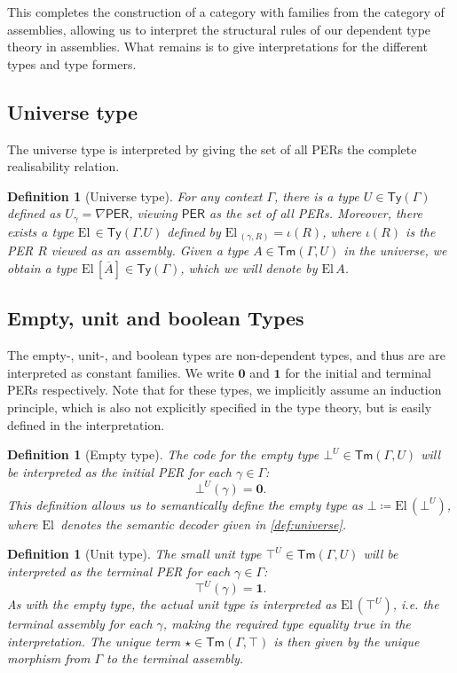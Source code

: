 \documentclass[10pt,a4paper]{article}
\newtheorem{definition}[theorem]{Definition}
\theoremstyle{definition}
\theoremstyle{remark}
\renewcommand{\.}{.\,} %
\renewcommand{\:}{:} %
\newcommand{\El}{\mathrm{El}\,}
\newcommand{\0}{\mathbf{0}}
\newcommand{\1}{\mathbf{1}}
\newcommand\<\langle
\renewcommand\>\rangle
\newcommand{\Per}{\mathsf{PER}}
\newcommand{\Ty}{\mathsf{Ty}}
\newcommand{\Tm}{\mathsf{Tm}}
\newcommand{\U}{U}
\theoremstyle{remark}
\begin{document}
This completes the construction of a category with families from the category of assemblies, allowing us to interpret the structural rules of our dependent type theory in assemblies. What remains is to give interpretations for the different types and type formers.

\subsection{Universe type}
The universe type is interpreted by giving the set of all PERs the complete realisability relation.
\begin{definition}[Universe type]\label{def:universe}
	For any context $\Gamma$, there is a type $\U \in \Ty(\Gamma)$ defined as $U_\gamma = \nabla \Per$, viewing $\Per$ as the set of all PERs. 
    Moreover, there exists a type $\El \in \Ty(\Gamma.\U)$ defined by $\El_{(\gamma, R)} = \iota(R)$, where $\iota(R)$ is the PER $R$ viewed as an assembly. Given a type $A \in \Tm(\Gamma, \U)$ in the universe, we obtain a type $\El[\overline{A}] \in \Ty(\Gamma)$, which we will denote by $\El A$.
\end{definition}

\subsection{Empty, unit and boolean Types}
The empty-, unit-, and boolean types are non-dependent types, and thus are are interpreted as constant families. We write $\0$ and $\1$ for the initial and terminal PERs respectively. Note that for these types, we implicitly assume an induction principle, which is also not explicitly specified in the type theory, but is easily defined in the interpretation.
\begin{definition}[Empty type]
The code for the empty type $\bot^\U \in \Tm(\Gamma, \U)$ will be interpreted as the initial PER for each $\gamma \in \Gamma$:
\[
\bot^\U(\gamma) = \0.
\]
This definition allows us to semantically define the empty type as $\bot \coloneq  \El (\bot^\U)$, where $\El$ denotes the semantic decoder given in \autoref{def:universe}.
\end{definition}

\begin{definition}[Unit type]
The small unit type $\top^\U \in \Tm(\Gamma, \U)$ will be interpreted as the terminal PER for each $\gamma \in \Gamma$:
\[
\top^\U(\gamma) = \1.
\]
As with the empty type, the actual unit type is interpreted as $\El (\top^\U)$, i.e. the terminal assembly for each $\gamma$, making the required type equality true in the interpretation.
The unique term $\star \in \Tm(\Gamma, \top)$ is then given by the unique morphism from $\Gamma$ to the terminal assembly.
\end{definition}
\end{document}
